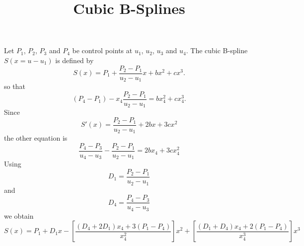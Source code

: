 \documentclass[aps]{revtex4}
\begin{document}
\title{Cubic B-Splines}
\maketitle

Let $P_1$, $P_2$, $P_3$ and $P_4$ be control points at $u_1$, $u_2$, $u_3$ and $u_4$.
The cubic B-spline $S(x=u-u_1)$ is defined by
$$
	S(x) = P_1 + \dfrac{P_2-P_1}{u_2-u_1} x + b x^2 + c x^3.
$$
so that
$$
	(P_4-P_1) - x_4 \dfrac{P_2-P_1}{u_2-u_1} = b x_4^2 + c x_4 ^3.
$$
Since
$$
	S'(x) = \dfrac{P_2-P_1}{u_2-u_1} + 2 b x + 3 c x^2
$$
the other equation is
$$
	\frac{P_4-P_3}{u_4-u_3} - \dfrac{P_2-P_1}{u_2-u_1} = 2 b x_4 + 3 c x_4^2
$$
Using
$$
	D_1 = \dfrac{P_2-P_1}{u_2-u_1}
$$
and
$$
 D_4 = \frac{P_4-P_3}{u_4-u_3}
$$	
we obtain
$$
	S(x) = P_1 + D_1 x - \left[\frac{(D_4+2D_1)x_4 + 3(P_1-P_4)}{x_4^2}\right] x^2
	+ \left[ \frac{(D_1+D_4)x_4 + 2(P_1-P_4)}{x_4^3}\right] x^3
$$
\end{document}
